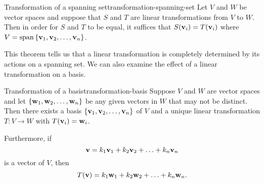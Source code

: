 \begin{theorem}{Transformation of a spanning set}{transformation-spanning-set}
  Let $V$ and $W$ be vector spaces and suppose that $S$ and $T$ are
  linear transformations from $V$ to $W$. Then in order for $S$ and
  $T$ to be equal, it suffices that $S(\mbox{\bf v}_i) = T(\mbox{\bf v}_i)$
  where $V=\sspan \set{\vect{v}_1, \vect{v}_2, \ldots, \vect{v}_n}$.
\end{theorem}

This theorem tells us that a linear transformation is completely
determined by its actions on a spanning set. We can also examine the
effect of a linear transformation on a basis.

\begin{theorem}{Transformation of a basis}{transformation-basis}
  Suppose $V$ and $W$ are vector spaces and let
  $\left\{\mbox{\bf w}_1, \mbox{\bf w}_2, \ldots, \mbox{\bf w}_n\right\}$ be any given
  vectors in $W$ that may not be distinct. Then there exists a basis
  $\left\{\mbox{\bf v}_1, \mbox{\bf v}_2, \ldots, \mbox{\bf v}_n\right\}$ of $V$ and a
  unique linear transformation $T: V \to W$ with
  $T (\mbox{\bf v}_i) = \mbox{\bf w}_i$.

  Furthermore, if
  \begin{equation*}
    \mbox{\bf v} = k_1\mbox{\bf v}_1+k_2\mbox{\bf v}_2+\ldots+ k_n\mbox{\bf v}_n
  \end{equation*}
  is a vector of $V$, then
  \begin{equation*}
    T(\mbox{\bf v}) = k_1\mbox{\bf w}_1+k_2\mbox{\bf w}_2+\ldots+ k_n\mbox{\bf w}_n.
  \end{equation*}
\end{theorem}
